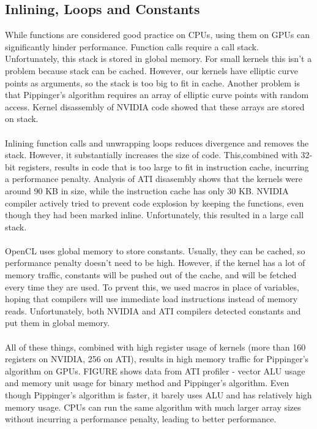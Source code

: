 \subsection{Inlining, Loops and Constants}

While functions are considered good practice on CPUs, using them on GPUs can significantly hinder performance. Function calls require a call stack. Unfortunately, this stack is stored in global memory. For small kernels this isn't a problem because stack can be cached. However, our kernels have elliptic curve points as arguments, so the stack is too big to fit in cache. Another problem is that Pippinger's algorithm requires an array of elliptic curve points with random access. Kernel disassembly of NVIDIA code showed that these arrays are stored on stack.\\
\\
Inlining function calls and unwrapping loops reduces divergence and removes the stack. However, it substantially increases the size of code. This,combined with 32-bit registers, results in code that is too large to fit in instruction cache, incurring a performance penalty. Analysis of ATI disasembly shows that the kernels were around 90 KB in size, while the instruction cache has only 30 KB. NVIDIA compiler actively tried to prevent code explosion by keeping the functions, even though they had been marked inline. Unfortunately, this resulted in a large call stack.\\
\\
OpenCL uses global memory to store constants. Usually, they can be cached, so performance penalty doesn't need to be high. However, if the kernel has a lot of memory traffic, constants will be pushed out of the cache, and will be fetched every time they are used. To prvent this, we used macros in place of variables, hoping that compilers will use immediate load instructions instead of memory reads. Unfortunately, both NVIDIA and ATI compilers detected constants and put them in global memory.\\
\\
All of these things, combined with high register usage of kernels (more than 160 registers on NVIDIA, 256 on ATI), results in high memory traffic for Pippinger's algorithm on GPUs. FIGURE shows data from ATI profiler - vector ALU usage and memory unit usage for binary method and Pippinger's algorithm. Even though Pippinger's algorithm is faster, it barely uses ALU and has relatively high memory usage. CPUs can run the same algorithm with much larger array sizes without incurring a performance penalty, leading to better performance.